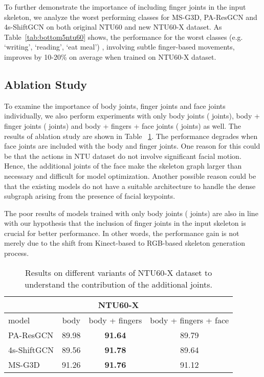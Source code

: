 \documentclass{article}
\begin{document}
To further demonstrate the importance of including finger joints in the input skeleton, we analyze the worst performing classes for MS-G3D, PA-ResGCN and 4s-ShiftGCN on both original NTU60 and new NTU60-X dataset. As Table~\ref{tab:bottom5ntu60} shows, the performance for the worst classes (e.g. `writing', `reading', `eat meal') , involving subtle finger-based movements, improves by 10-20\% on average when trained on NTU60-X dataset. 

\subsection{Ablation Study}
\label{sec:ablation}

To examine the importance of body joints, finger joints and face joints individually, we also perform experiments with only body joints ( joints), body + finger joints ( joints) and body + fingers + face joints ( joints) as well. The results of ablation study are shown in Table ~\ref{tab:face-finger-comparison}. The performance degrades when face joints are included with the body and finger joints. One reason for this could be that the actions in NTU dataset do not involve significant facial motion. Hence, the additional joints of the face make the skeleton graph larger than necessary and difficult for model optimization. Another possible reason could be that the existing models do not have a suitable architecture to handle the dense subgraph arising from the presence of facial keypoints. 

The poor results of models trained with only body joints ( joints) are also in line with our hypothesis that the inclusion of finger joints in the input skeleton is crucial for better performance. In other words, the performance gain is not merely due to the shift from Kinect-based to RGB-based skeleton generation process.

\begin{table}[!t]
\resizebox{\linewidth}{!}
 {\centering 
 \begin{tabular}{l|c|c|c}
 \toprule
    \multicolumn{4}{c}{NTU60-X}\\
   \midrule
   model & body & body + fingers & body + fingers + face\\
   \midrule
   PA-ResGCN\cite{song2020stronger} & 89.98 & \textbf{91.64} & 89.79\\
   4s-ShiftGCN\cite{cheng2020shiftgcn} & 89.56 & \textbf{91.78} & 89.64\\
   MS-G3D\cite{liu2020disentangling} & 91.26 & \textbf{91.76} & 91.12\\
  \bottomrule
 \end{tabular}
  }
\caption{\label{tab:face-finger-comparison} Results on different variants of NTU60-X dataset to understand the contribution of the additional joints.}
\end{table}
\end{document}
